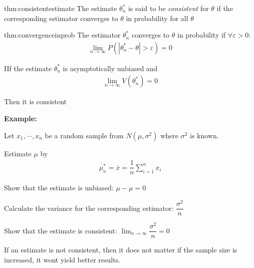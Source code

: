 \par\bigskip
\begin{theo}{thm:consistentestimate}
  The estimate $\theta_n^*$ is said to be \textit{consistent} for $\theta$ if the corresponding estimator converges to $\theta$ in probability for all $\theta$
\end{theo}
\par\bigskip
\begin{theo}{thm:convergenceinprob}
  The estimator $\theta_n^*$ converges to $\theta$ in probability if $\forall \varepsilon>0$:
  \begin{equation*}
    \begin{gathered}
      \lim_{n\to\infty} P(\left|\theta_n^*-\theta\right|>\varepsilon)=0
    \end{gathered}
  \end{equation*}
\end{theo}
\par\bigskip
\begin{theo}
  IIf the estimate $\theta_n^*$ is asymptotically unbiased and
  \begin{equation*}
    \begin{gathered}
      \lim_{n\to\infty} V(\theta_n^*) = 0
    \end{gathered}
  \end{equation*}\par
  \noindent Then it is consistent
\end{theo}
\par\bigskip
\noindent\textbf{Example:}\par
\noindent Let $x_1,\cdots,x_n$ be a random sample from $N(\mu,\sigma^2)$ where $\sigma^2$ is known.\par
\noindent Estimate $\mu$ by
\begin{equation*}
  \begin{gathered}
    \mu_n^* = \overline{x} = \dfrac{1}{n}\sum_{i=1}^{n}x_i
  \end{gathered}
\end{equation*}\par
\noindent Show that the estimate is unbiased: $\mu-\mu=0$\par
\noindent Calculate the variance for the corresponding estimator: $\dfrac{\sigma^2}{n}$\par
\noindent Show that the estimate is consistent: $\lim_{n\to\infty}\dfrac{\sigma^2}{n} =0$
\par\bigskip
\noindent If an estimate is not consistent, then it does not matter if the sample size is increased, it wont yield better results.
